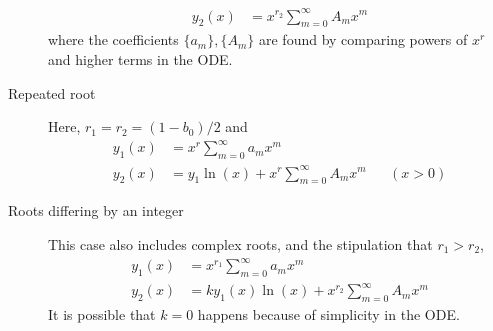 \begin{description}
\begin{align}
            y_2(x) & = x^{r_2} \sum_{m=0}^{\infty}A_m x^m
        \end{align}
        where the coefficients $ \{a_m\}, \{A_m\} $ are found by comparing powers of
        $ x^r $ and higher terms in the ODE.
    \item[Repeated root] Here, $ r_1 = r_2 = (1 - b_0)/2 $ and
        \begin{align}
            y_1(x) & = x^{r} \sum_{m=0}^{\infty}a_m x^m                         \\
            y_2(x) & = y_1 \ln(x) + x^{r} \sum_{m=0}^{\infty}A_m x^m &  & (x>0)
        \end{align}
    \item[Roots differing by an integer] This case also includes complex roots,
        and the stipulation that $ r_1 > r_2 $,
        \begin{align}
            y_1(x) & = x^{r_1} \sum_{m=0}^{\infty}a_m x^m                  \\
            y_2(x) & = ky_1(x) \ln(x) + x^{r_2} \sum_{m=0}^{\infty}A_m x^m
        \end{align}
        It is possible that $ k=0 $ happens because of simplicity in the ODE.
\end{description}

